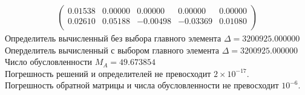 \documentclass[a4paper,12pt,titlepage,finall]{article}
\begin{document}
\begin{enumerate}
\begin{align*}
\begin{pmatrix}
   0.01538&     0.00000&     0.00000&     0.00000&     0.00000 \\
   0.02610&     0.05188&    -0.00498&    -0.03369&     0.01080 \\
\end{pmatrix}
\end{align*}
Определитель вычисленный без выбора главного элемента  $\Delta = 3200925.000000$\\
Оперделитель вычисленный с выбором главного элемента $\Delta = 3200925.000000$\\
Число обусловленности $M_A = 49.673854$\\
Погрешность решений и определителей не превосходит $2 \times 10^{-17}$.\\
Погрешность обратной матрицы и числа обусловленности не превосходит $10^{-6}$.


\end{enumerate}
\end{document}
